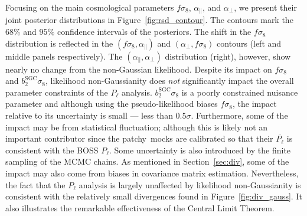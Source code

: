 \documentclass[12pt, letterpaper, preprint]{aastex}
\let\oldmarginpar\marginpar
\renewcommand\marginpar[1]{\-\oldmarginpar[\raggedleft\footnotesize #1]%
  {\raggedright\footnotesize #1}}
\newcommand{\todo}[1]{\marginpar{\color{red}TODO}{\color{red}#1}}
\newcommand{\patchy}{{\fontshape\scdefault\selectfont patchy}}
\begin{document}
Focusing on the main cosmological parameters $f \sigma_8$, 
$\alpha_\parallel$, and $\alpha_\perp$, we present their 
joint posterior distributions in Figure~\ref{fig:rsd_contour}.  
The contours mark the $68\%$ and $95\%$ confidence intervals
of the posteriors. The shift in the $f \sigma_8$ distribution 
is reflected in the
$(f\sigma_8, \alpha_\parallel)$ and $(\alpha_\perp, f\sigma_8)$ 
contours (left and middle panels respectively). The 
$(\alpha_\parallel, \alpha_\perp)$ distribution (right), however, show nearly 
no change from the non-Gaussian likelihood. %
Despite its impact on $f \sigma_8$ and $b_2^\mathrm{SGC} \sigma_8$, 
likelihood non-Gaussianity does \emph{not}
significantly impact the overall parameter constraints of the $P_\ell$ 
analysis. $b_2^\mathrm{SGC} \sigma_8$ is a poorly constrained nuisance 
parameter and although using the pseudo-likelihood biases $f \sigma_8$, 
the impact relative to its uncertainty is small --- less than $0.5 \sigma$. 
Furthermore, some of the impact may be from statistical fluctuation; although
this is likely not an important contributor since the \patchy~mocks are 
calibrated so that their $\overline{P_\ell}$ is consistent with the BOSS $P_\ell$. 
Some uncertainty is also introduced by the finite sampling of the MCMC chains. 
As mentioned in Section~\ref{sec:div}, some of the impact may also come 
from biases in covariance matrix estimation. Nevertheless, the fact that 
the $P_\ell$ analysis is largely unaffected by likelihood 
non-Gaussianity is consistent with the relatively small divergences found 
in Figure~\ref{fig:div_gauss}. It also illustrates
the remarkable effectiveness of the Central Limit Theorem. 
\end{document}

